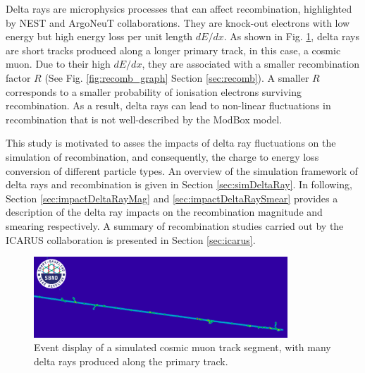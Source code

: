 Delta rays are microphysics processes that can affect recombination, highlighted by NEST \cite{NEST} and ArgoNeuT \cite{argoneut_recomb} collaborations.
They are knock-out electrons with low energy but high energy loss per unit length $dE/dx$.
As shown in Fig. \ref{fig:delta_ray_evd}, delta rays are short tracks produced along a longer primary track, in this case, a cosmic muon.                      
Due to their high $dE/dx$, they are associated with a smaller recombination factor $R$ (See Fig. \ref{fig:recomb_graph} Section \ref{sec:recomb}).
A smaller $R$ corresponds to a smaller probability of ionisation electrons surviving recombination.
As a result, delta rays can lead to non-linear fluctuations in recombination that is not well-described by the ModBox model.

This study is motivated to asses the impacts of delta ray fluctuations on the simulation of recombination, and consequently, the charge to energy loss conversion of different particle types.
An overview of the simulation framework of delta rays and recombination is given in Section \ref{sec:simDeltaRay}.%
In following, Section \ref{sec:impactDeltaRayMag} and \ref{sec:impactDeltaRaySmear} provides a description of the delta ray impacts on the recombination magnitude and smearing respectively.
A summary of recombination studies carried out by the ICARUS collaboration is presented in Section \ref{sec:icarus}.

\begin{figure}[hb!] 
\centering    
\includegraphics[width=0.85\textwidth]{delta_ray_evd}
\caption[Event Display of a Cosmic Muon and Delta Rays]{
Event display of a simulated cosmic muon track segment, with many delta rays produced along the primary track.
}
\label{fig:delta_ray_evd}
\end{figure}


